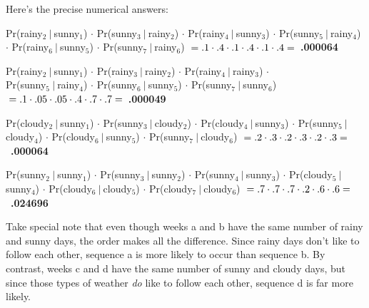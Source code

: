 \begin{alttitles}
Here's the precise numerical answers:

\begin{compactenum}[a.]
\small
\item
Pr(rainy$_2\ |\ $sunny$_1$) $\cdot$
Pr(sunny$_3\ |\ $rainy$_2$) $\cdot$
Pr(rainy$_4\ |\ $sunny$_3$) $\cdot$
Pr(sunny$_5\ |\ $rainy$_4$) $\cdot$
Pr(rainy$_6\ |\ $sunny$_5$) $\cdot$
Pr(sunny$_7\ |\ $rainy$_6$) $\\=
.1 \cdot .4 \cdot .1 \cdot .4 \cdot .1 \cdot .4 = $\ \textbf{.000064} \\
\item
Pr(rainy$_2\ |\ $sunny$_1$) $\cdot$
Pr(rainy$_3\ |\ $rainy$_2$) $\cdot$
Pr(rainy$_4\ |\ $rainy$_3$) $\cdot$\\
Pr(sunny$_5\ |\ $rainy$_4$) $\cdot$
Pr(sunny$_6\ |\ $sunny$_5$) $\cdot$
Pr(sunny$_7\ |\ $sunny$_6$) $\\=
.1 \cdot .05 \cdot .05 \cdot .4 \cdot .7 \cdot .7 = $\ \textbf{.000049} \\
\item
Pr(cloudy$_2\ |\ $sunny$_1$) $\cdot$
Pr(sunny$_3\ |\ $cloudy$_2$) $\cdot$
Pr(cloudy$_4\ |\ $sunny$_3$) $\cdot$
Pr(sunny$_5\ |\ $cloudy$_4$) $\cdot$
Pr(cloudy$_6\ |\ $sunny$_5$) $\cdot$
Pr(sunny$_7\ |\ $cloudy$_6$) $\\=
.2 \cdot .3 \cdot .2 \cdot .3 \cdot .2 \cdot .3 = $\ \textbf{.000064} \\
\item
Pr(sunny$_2\ |\ $sunny$_1$) $\cdot$
Pr(sunny$_3\ |\ $sunny$_2$) $\cdot$
Pr(sunny$_4\ |\ $sunny$_3$) $\cdot$
Pr(cloudy$_5\ |\ $sunny$_4$) $\cdot$
Pr(cloudy$_6\ |\ $cloudy$_5$) $\cdot$
Pr(cloudy$_7\ |\ $cloudy$_6$) $\\=
.7 \cdot .7 \cdot .7 \cdot .2 \cdot .6 \cdot .6 = $\ \textbf{.024696} \\

\end{compactenum}

Take special note that even though weeks a and b have the same number of rainy
and sunny days, the order makes all the difference. Since rainy days don't like
to follow each other, sequence a is more likely to occur than sequence b. By
contrast, weeks c and d have the same number of sunny and cloudy days, but
since those types of weather \textit{do} like to follow each other, sequence d
is far more likely.

\label{markovPuzzleSol}


\end{alttitles}

